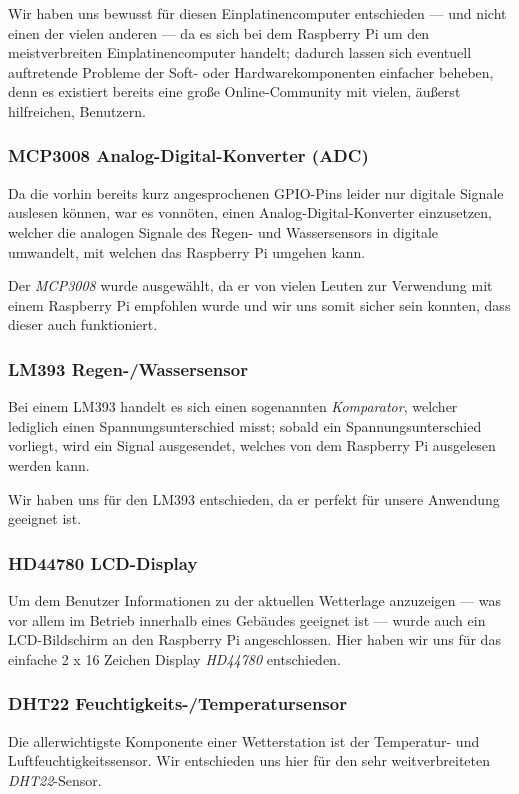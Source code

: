 \documentclass[a4paper,12pt]{article}
\begin{document}
Wir haben uns bewusst für diesen Einplatinencomputer entschieden — und nicht einen der vielen anderen — da es sich bei dem Raspberry Pi um den meistverbreiten Einplatinencomputer handelt; dadurch lassen sich eventuell auftretende Probleme der Soft- oder Hardwarekomponenten einfacher beheben, denn es existiert bereits eine große Online-Community mit vielen, äußerst hilfreichen, Benutzern.

\subsubsection{MCP3008 Analog-Digital-Konverter (ADC)}
Da die vorhin bereits kurz angesprochenen GPIO-Pins leider nur digitale Signale auslesen können, war es vonnöten, einen Analog-Digital-Konverter einzusetzen, welcher die analogen Signale des Regen- und Wassersensors in digitale umwandelt, mit welchen das Raspberry Pi umgehen kann.

Der \textit{MCP3008} wurde ausgewählt, da er von vielen Leuten zur Verwendung mit einem Raspberry Pi empfohlen wurde und wir uns somit sicher sein konnten, dass dieser auch funktioniert.

\subsubsection{LM393 Regen-/Wassersensor}
Bei einem LM393 handelt es sich einen sogenannten \textit{Komparator}, welcher lediglich einen Spannungsunterschied misst; sobald ein Spannungsunterschied vorliegt, wird ein Signal ausgesendet, welches von dem Raspberry Pi ausgelesen werden kann.

Wir haben uns für den LM393 entschieden, da er perfekt für unsere Anwendung geeignet ist.

\subsubsection{HD44780 LCD-Display}
Um dem Benutzer Informationen zu der aktuellen Wetterlage anzuzeigen — was vor allem im Betrieb innerhalb eines Gebäudes geeignet ist — wurde auch ein LCD-Bildschirm an den Raspberry Pi angeschlossen.
Hier haben wir uns für das einfache 2 x 16 Zeichen Display \textit{HD44780} entschieden.

\subsubsection{DHT22 Feuchtigkeits-/Temperatursensor}
Die allerwichtigste Komponente einer Wetterstation ist der Temperatur- und Luftfeuchtigkeitssensor. Wir entschieden uns hier für den sehr weitverbreiteten \textit{DHT22}-Sensor. 
\end{document}
